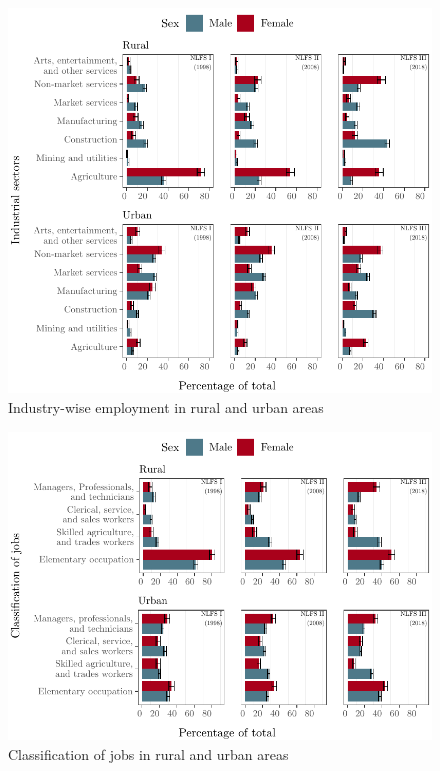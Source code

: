 \begin{figure}[htb!]
	\centering
	\includegraphics{./figure/industryUrbRur_bar_all_all}
	\caption{Industry-wise employment in rural and urban areas}
	\label{fig:industryUrbRur}
\end{figure}


\begin{figure}[htb!]
	\centering
	\includegraphics{./figure/occupationUrbRur_bar_all_all}
	\caption{Classification of jobs in rural and urban areas}
	\label{fig:occupationUrbRur}
\end{figure}

